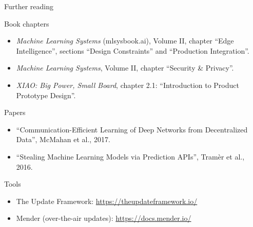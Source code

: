 \begin{frame}{Further reading}
  \footnotesize
  \begin{block}{Book chapters}
    \begin{itemize}
      \item \emph{Machine Learning Systems} (mlsysbook.ai), Volume II, chapter
            ``Edge Intelligence'', sections ``Design Constraints'' and
            ``Production Integration''.
      \item \emph{Machine Learning Systems}, Volume II, chapter ``Security \&
            Privacy''.
      \item \emph{XIAO: Big Power, Small Board}, chapter 2.1: ``Introduction
            to Product Prototype Design''.
    \end{itemize}
  \end{block}
  \begin{block}{Papers}
    \begin{itemize}
      \item ``Communication-Efficient Learning of Deep Networks from
            Decentralized Data'', McMahan et al., 2017.
      \item ``Stealing Machine Learning Models via Prediction APIs'',
            Tram{\`e}r et al., 2016.
    \end{itemize}
  \end{block}
  \begin{block}{Tools}
    \begin{itemize}
      \item The Update Framework: \url{https://theupdateframework.io/}
      \item Mender (over-the-air updates): \url{https://docs.mender.io/}
    \end{itemize}
  \end{block}
\end{frame}
